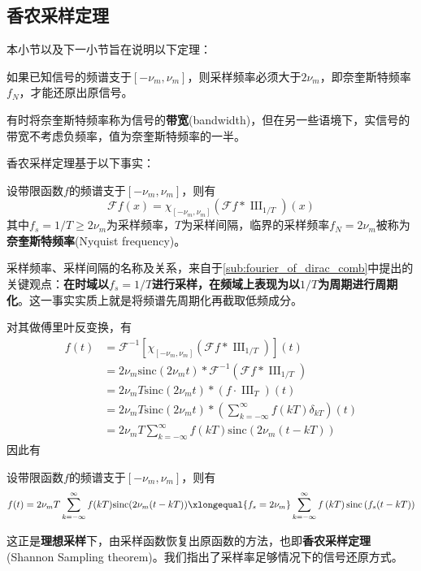 \documentclass{ctexbook}
\newcommand{\shah}{\operatorname{III}}
\begin{document}
\subsection{香农采样定理}\label{sub:shannon}
本小节以及下一小节旨在说明以下定理：
\begin{theorem}[香农采样定理]
    如果已知信号的频谱支于$[-\nu_m,\nu_m]$，则采样频率必须大于$2\nu_m$，即奈奎斯特频率$f_N$，才能还原出原信号\cite{brad_osgood_ee261}。
\end{theorem}
有时将奈奎斯特频率称为信号的\textbf{带宽}(bandwidth)，但在另一些语境下，实信号的带宽不考虑负频率，值为奈奎斯特频率的一半。

香农采样定理基于以下事实：
\begin{theorem}[采样定理]
    设带限函数$f$的频谱支于$[-\nu_m,\nu_m]$，则有
    \[\mathcal{F} f(x)=\chi_{[-\nu_m,\nu_m]}(\mathcal{F} f*\shah_{1/T})(x)\]
    其中$f_s=1/T\geq 2\nu_m$为采样频率，$T$为采样间隔，临界的采样频率$f_N=2\nu_m$被称为\textbf{奈奎斯特频率}(Nyquist frequency)。
\end{theorem}

采样频率、采样间隔的名称及关系，来自于\ref{sub:fourier_of_dirac_comb}中提出的关键观点：\textbf{在时域以$f_s=1/T$进行采样，在频域上表现为以$1/T$为周期进行周期化}。这一事实实质上就是将频谱先周期化再截取低频成分。

对其做傅里叶反变换，有\begin{align*}
    f(t)&=\mathcal{F} ^{-1} [\chi_{[-\nu_m,\nu_m]}(\mathcal{F} f*\shah_{1/T})](t)\\
    &=2\nu_m\text{sinc}(2\nu_m t)*\mathcal{F} ^{-1} \left(\mathcal{F} f*\shah_{1/T}\right)\\
    &=2\nu_m T\text{sinc}(2\nu_m t)*\left(f\cdot\shah_T\right)(t)\\
    &=2\nu_m T\text{sinc}(2\nu_m t)*\left(\sum_{k=-\infty}^{\infty}f(kT)\delta_{kT}\right)(t)\\
    &=2\nu_m T\sum_{k=-\infty}^{\infty}f(kT)\text{sinc}(2\nu_m (t-kT))
\end{align*}
因此有\begin{theorem}
    设带限函数$f$的频谱支于$[-\nu_m,\nu_m]$，则有
    \begin{align*}
        f(t)=2\nu_m T\sum_{k=-\infty}^{\infty}f(kT)\text{sinc}(2\nu_m (t-kT))\xlongequal{f_s=2\nu_m} \sum_{k=-\infty}^{\infty}f\left(kT\right)\text{sinc}\left(f_s(t-kT)\right)
    \end{align*}
\end{theorem}
这正是\textbf{理想采样}下，由采样函数恢复出原函数的方法，也即\textbf{香农采样定理}(Shannon Sampling theorem)。我们指出了采样率足够情况下的信号还原方式。
\end{document}
